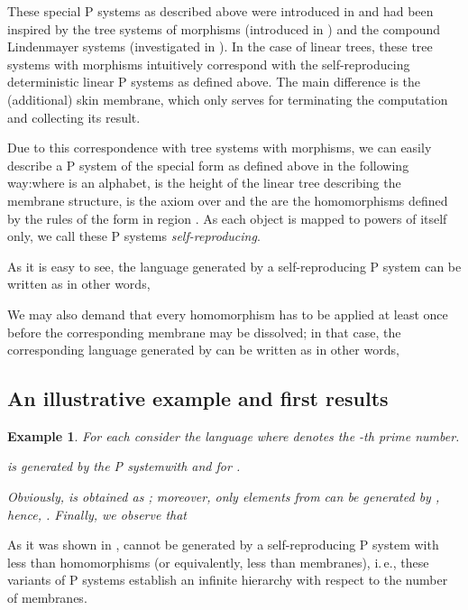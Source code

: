 \documentclass[copyright]{eptcs}
\makeatletter
\newtheorem{example}[theorem]{Example\dromanb}
\newcommand*{\dromanb}{\gdef\d@tstyle{\rmfamily\upshape\mdseries}}
\newcommand{\d@tstyle}{}
\makeatother
\begin{document}
\bigskip

These special P systems as described above were introduced in \cite {Freund2001} and had been inspired by the tree systems of morphisms
(introduced in \cite{Dassowetal2001}) and the compound Lindenmayer systems
(investigated in \cite{Dassow1986}). In the case of linear trees, these tree
systems with morphisms intuitively correspond with the self-reproducing
deterministic linear P systems as defined above. The main difference is the
(additional) skin membrane, which only serves for terminating the
computation and collecting its result.

\medskip

Due to this correspondence with tree systems with morphisms, we can easily
describe a P system of the special form as defined above in the following
way:where  is an alphabet,  is the height of the linear tree describing
the membrane structure,  is the axiom over  and the  are the
homomorphisms defined by the rules of the form  in
region . As each object is mapped to powers of itself only, we call these
P systems \textit{self-reproducing}.

\medskip

As it is easy to see, the language generated by a self-reproducing P system 
can be written as 
in other words, 


We may also demand that every homomorphism has to be applied at least once
before the corresponding membrane may be dissolved; in that case, the
corresponding language generated by\linebreak
\hbox{} can be written as 
in other words, 


\subsection{An illustrative example and first results}

\begin{example}
\label{Example1}For each  consider the language 
where  denotes the -th prime number.

 is generated by the P systemwith    and  for   .

Obviously,  is obtained as 
;
moreover, only elements from  can be generated by , hence, . Finally, we observe that 

\end{example}

As it was shown in \cite{Freund2001},  cannot be
generated by a self-reproducing P system with less than  homomorphisms
(or equivalently, less than  membranes), i.\,e., these variants of P
systems establish an infinite hierarchy with respect to the number of
membranes.
\end{document}
